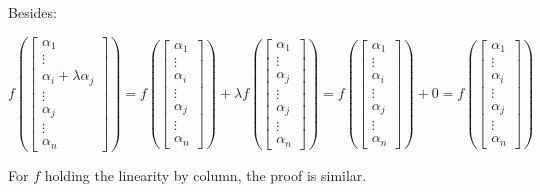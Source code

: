 \documentclass{article}
\begin{document}
Besides:

\begin{equation}
f(
\begin{bmatrix}
    \alpha_1 \\
    \vdots \\
    \alpha_i + \lambda\alpha_j \\
    \vdots \\
    \alpha_j \\
    \vdots \\
    \alpha_n
\end{bmatrix}) = 
f(\begin{bmatrix}
    \alpha_1 \\
    \vdots \\
    \alpha_i \\
    \vdots \\
    \alpha_j \\
    \vdots \\
    \alpha_n
\end{bmatrix}) +
\lambda f(\begin{bmatrix}
    \alpha_1 \\
    \vdots \\
    \alpha_j \\
    \vdots \\
    \alpha_j \\
    \vdots \\
    \alpha_n
\end{bmatrix}) =
f(\begin{bmatrix}
    \alpha_1 \\
    \vdots \\
    \alpha_i \\
    \vdots \\
    \alpha_j \\
    \vdots \\
    \alpha_n
\end{bmatrix}) + 0 =
f(\begin{bmatrix}
    \alpha_1 \\
    \vdots \\
    \alpha_i \\
    \vdots \\
    \alpha_j \\
    \vdots \\
    \alpha_n
\end{bmatrix})
\end{equation}

For \(f\) holding the linearity by column, the proof is similar.
\end{document}
